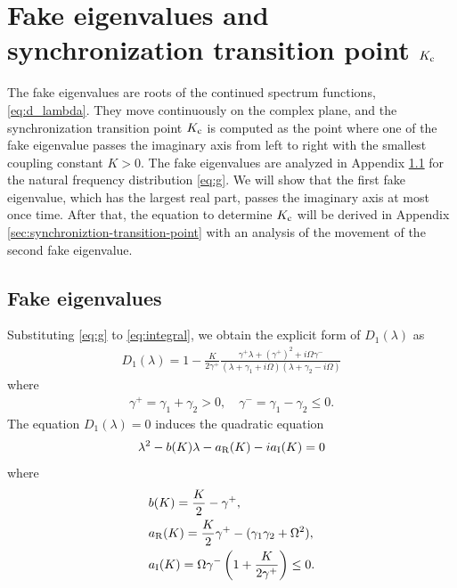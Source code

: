 \section{Fake eigenvalues and synchronization transition point $K_{\rm c}$}
\label{sec:Kc}
  The fake eigenvalues are roots of the continued spectrum functions,
  \eqref{eq:d_lambda}. They move continuously on the complex plane,
  and the synchronization transition point $K_{\rm c}$ is computed
  as the point where one of the fake eigenvalue passes the imaginary axis
  from left to right with the smallest coupling constant $K>0$.
  The fake eigenvalues are analyzed in Appendix \ref{sec:fake-eigenvalues}
  for the natural frequency distribution \eqref{eq:g}.
  We will show that the first fake eigenvalue,
  which has the largest real part,
  passes the imaginary axis at most once time.
  After that, the equation to determine $K_{\rm c}$ will be derived
  in Appendix \ref{sec:synchroniztion-transition-point}
  with an analysis of the movement of the second fake eigenvalue.
  

\subsection{Fake eigenvalues}
\label{sec:fake-eigenvalues}

Substituting \eqref{eq:g} to \eqref{eq:integral},
we obtain the explicit form of $D_{1}(\lambda)$ as
\begin{align}
  D_{1}(\lambda)
  = 1 - \frac{K}{2\gamma^{+}}
  \frac{\gamma^{+}\lambda + (\gamma^{+})^{2}+i\Omega\gamma^{-}}
  {(\lambda+\gamma_{1}+i\Omega)(\lambda+\gamma_{2}-i\Omega)}
\end{align}
where
\begin{align}
  \gamma^{+} = \gamma_{1} + \gamma_{2} > 0,
  \quad
  \gamma^{-} = \gamma_{1} - \gamma_{2} \leq 0.
\end{align}
The equation $D_{1}(\lambda)=0$ induces the quadratic equation
\begin{align}
  \lambda^{2} - b(K)\lambda - a_{\rm R}(K) - ia_{\rm I}(K) = 0
  \label{eq:quadratic-equation-lambda}
\end{align}
where
\begin{align}
  \begin{aligned}
    & b(K) = \frac{K}{2} - \gamma^{+}, \\
    & a_{\rm R}(K) = \frac{K}{2} \gamma^{+} - (\gamma_{1}\gamma_{2}+\Omega^{2}), \\
    & a_{\rm I}(K) = \Omega\gamma^{-} \left( 1 + \frac{K}{2\gamma^{+}} \right) \leq 0.
  \end{aligned}
\end{align}

